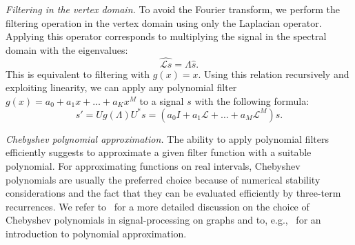 \documentclass{article}
\newcommand{\Lap}{\mathcal{L}}
\begin{document}
\textit{Filtering in the vertex domain. } To avoid the Fourier transform, we perform the filtering operation in the vertex domain using only the Laplacian operator. Applying this operator corresponds to multiplying the signal in the spectral domain with the eigenvalues:
$$
\widehat{\Lap s} = \Lambda \hat{s}\text{.}
$$
This is equivalent to filtering with $g(x) = x$. Using this relation recursively and exploiting linearity, we can apply any polynomial filter $g(x) = a_0 + a_1 x  +\dots + a_K x^M$ to a signal $s$ with the following formula:
\begin{equation} \label{eq:polynomial_filter}
s' = U g(\Lambda) U^* s = \left(a_0 I + a_1 \Lap + \dots + a_M \Lap^M \right)s.
\end{equation}

\textit{Chebyshev polynomial approximation. }
The ability to apply polynomial filters efficiently suggests to 
approximate a given filter function with a suitable polynomial.
For approximating functions on real intervals, Chebyshev polynomials are usually the preferred choice because of numerical stability considerations and the fact that they can be evaluated efficiently by three-term recurrences.
We refer to~\cite{hammond2011wavelets} for a more detailed discussion on the choice of Chebyshev polynomials in signal-processing on graphs and to, e.g.,~\cite{phillips2003interpolation} for an introduction to polynomial approximation.
\end{document}

